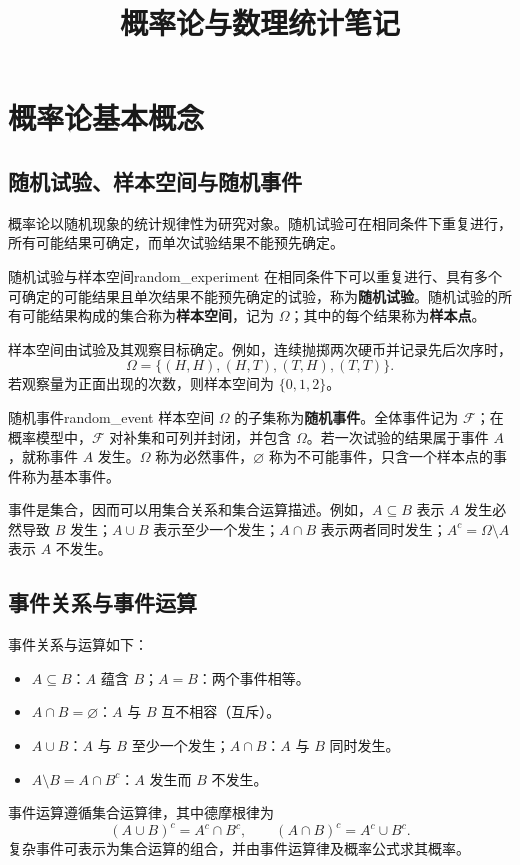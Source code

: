 \documentclass[11pt,a4paper,fontset=fandol]{ctexart}
\theoremstyle{remark}
\begin{document}
\title{概率论与数理统计笔记}
\author{}
\date{}
\maketitle
\tableofcontents
\clearpage
{}

\section{概率论基本概念}
\subsection{随机试验、样本空间与随机事件}
概率论以随机现象的统计规律性为研究对象。随机试验可在相同条件下重复进行，所有可能结果可确定，而单次试验结果不能预先确定。

\begin{definition}{随机试验与样本空间}{random_experiment}
在相同条件下可以重复进行、具有多个可确定的可能结果且单次结果不能预先确定的试验，称为\textbf{随机试验}。随机试验的所有可能结果构成的集合称为\textbf{样本空间}，记为 $\Omega$；其中的每个结果称为\textbf{样本点}。
\end{definition}

样本空间由试验及其观察目标确定。例如，连续抛掷两次硬币并记录先后次序时，
\[
    \Omega=\{(H,H),(H,T),(T,H),(T,T)\}.
\]
若观察量为正面出现的次数，则样本空间为 $\{0,1,2\}$。

\begin{definition}{随机事件}{random_event}
样本空间 $\Omega$ 的子集称为\textbf{随机事件}。全体事件记为 $\mathcal{F}$；在概率模型中，$\mathcal{F}$ 对补集和可列并封闭，并包含 $\Omega$。若一次试验的结果属于事件 $A$，就称事件 $A$ 发生。$\Omega$ 称为必然事件，$\varnothing$ 称为不可能事件，只含一个样本点的事件称为基本事件。
\end{definition}

事件是集合，因而可以用集合关系和集合运算描述。例如，$A\subseteq B$ 表示 $A$ 发生必然导致 $B$ 发生；$A\cup B$ 表示至少一个发生；$A\cap B$ 表示两者同时发生；$A^c=\Omega\setminus A$ 表示 $A$ 不发生。

\subsection{事件关系与事件运算}
事件关系与运算如下：
\begin{itemize}
    \item $A\subseteq B$：$A$ 蕴含 $B$；$A=B$：两个事件相等。
    \item $A\cap B=\varnothing$：$A$ 与 $B$ 互不相容（互斥）。
    \item $A\cup B$：$A$ 与 $B$ 至少一个发生；$A\cap B$：$A$ 与 $B$ 同时发生。
    \item $A\setminus B=A\cap B^c$：$A$ 发生而 $B$ 不发生。
\end{itemize}
事件运算遵循集合运算律，其中德摩根律为
\[
    (A\cup B)^c=A^c\cap B^c,\qquad
    (A\cap B)^c=A^c\cup B^c.
\]
复杂事件可表示为集合运算的组合，并由事件运算律及概率公式求其概率。
\end{document}
